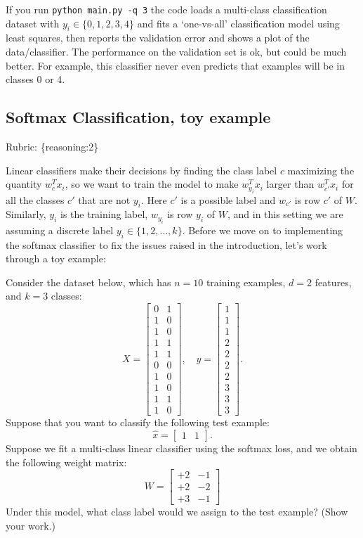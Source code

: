 \documentclass{article}
\def\rubric#1{\gre{Rubric: \{#1\}}}{}
\def\blu#1{{\color{blu}#1}}
\def\gre#1{{\color{gre}#1}}
\begin{document}
If you run \verb|python main.py -q 3| the code loads a multi-class
classification dataset with $y_i \in \{0,1,2,3,4\}$ and fits a `one-vs-all' classification
model using least squares, then reports the validation error and shows a plot of the data/classifier.
The performance on the validation set is ok, but could be much better.
For example, this classifier never even predicts that examples will be in classes 0 or 4.


\subsection{Softmax Classification, toy example}
\rubric{reasoning:2}

Linear classifiers make their decisions by finding the class label $c$ maximizing the quantity $w_c^Tx_i$, so we want to train the model to make $w_{y_i}^Tx_i$ larger than $w_{c'}^Tx_i$ for all the classes $c'$ that are not $y_i$.
Here $c'$ is a possible label and $w_{c'}$ is row $c'$ of $W$. Similarly, $y_i$ is the training label, $w_{y_i}$ is row $y_i$ of $W$, and in this setting we are assuming a discrete label $y_i \in \{1,2,\dots,k\}$. Before we move on to implementing the softmax classifier to fix the issues raised in the introduction, let's work through a toy example:

Consider the dataset below, which has $n=10$ training examples, $d=2$ features, and $k=3$ classes:
\[
X = \begin{bmatrix}0 & 1\\1 & 0\\ 1 & 0\\ 1 & 1\\ 1 & 1\\ 0 & 0\\  1 & 0\\  1 & 0\\  1 & 1\\  1 &0\end{bmatrix}, \quad y = \begin{bmatrix}1\\1\\1\\2\\2\\2\\2\\3\\3\\3\end{bmatrix}.
\]
Suppose that you want to classify the following test example:
\[
\hat{x} = \begin{bmatrix}1 & 1\end{bmatrix}.
\]
Suppose we fit a multi-class linear classifier using the softmax loss, and we obtain the following weight matrix:
\[
W =
\begin{bmatrix}
+2 & -1\\
+2 & -2\\
+3 & -1
\end{bmatrix}
\]
\blu{Under this model, what class label would we assign to the test example? (Show your work.)}
\end{document}
